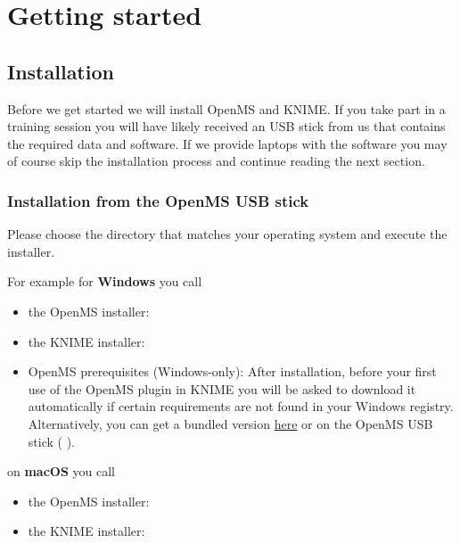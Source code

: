 

\setcounter{equation}{0}

\section{Getting started}

\subsection{Installation}

Before we get started we will install OpenMS and KNIME. If you take part in a training session you will have likely received an USB stick from us that contains the required data and software. If we provide laptops with the software you may of course skip the installation process and continue reading the next section.

\subsubsection{Installation from the OpenMS USB stick}
Please choose the directory that matches your operating system and execute the installer. 

For example for \textbf{Windows} you call
\begin{itemize}
  \item the OpenMS installer: \directory{\WindowsOpenMSInstallerName}
  \item the KNIME installer:  \directory{\WindowsKnimeInstallerName}
  \item OpenMS prerequisites (Windows-only): After installation, before your first use of the OpenMS plugin in KNIME you will be asked to download it automatically if certain requirements are not found in your Windows registry. Alternatively, you can get a bundled version \href{\WindowsPrerequisitesLink}{here} or on the OpenMS USB stick ( \directory{\WindowsOpenMSPrereqInstallerName} ).
\end{itemize}

on \textbf{macOS} you call
\begin{itemize}
  \item the OpenMS installer: \directory{\MacOpenMSInstallerName}
  \item the KNIME installer: \directory{\MacKnimeInstallerName}
\end{itemize}

